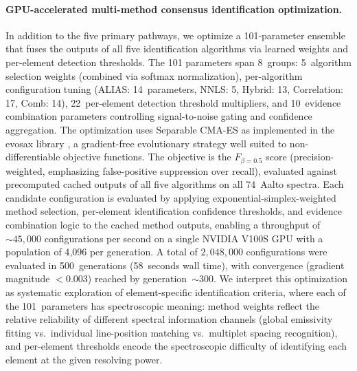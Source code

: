 \paragraph{GPU-accelerated multi-method consensus identification optimization.}
In addition to the five primary pathways, we optimize a 101-parameter ensemble that fuses the outputs of all five identification algorithms via learned weights and per-element detection thresholds.
The 101 parameters span 8~groups: 5~algorithm selection weights (combined via softmax normalization), per-algorithm configuration tuning (ALIAS: 14~parameters, NNLS: 5, Hybrid: 13, Correlation: 17, Comb: 14), 22~per-element detection threshold multipliers, and 10~evidence combination parameters controlling signal-to-noise gating and confidence aggregation.
The optimization uses Separable CMA-ES \citep{Hansen2001,Ros2008} as implemented in the evosax library \citep{Lange2023}, a gradient-free evolutionary strategy well suited to non-differentiable objective functions.
The objective is the $F_{\beta=0.5}$ score \citep{VanRijsbergen1979} (precision-weighted, emphasizing false-positive suppression over recall), evaluated against precomputed cached outputs of all five algorithms on all 74~Aalto spectra.
Each candidate configuration is evaluated by applying exponential-simplex-weighted method selection, per-element identification confidence thresholds, and evidence combination logic to the cached method outputs, enabling a throughput of ${\sim}45{,}000$ configurations per second on a single NVIDIA V100S GPU with a population of 4{,}096 per generation.
A total of $2{,}048{,}000$ configurations were evaluated in 500~generations (58~seconds wall time), with convergence (gradient magnitude $< 0.003$) reached by generation~$\sim$300.
We interpret this optimization as systematic exploration of element-specific identification criteria, where each of the 101~parameters has spectroscopic meaning: method weights reflect the relative reliability of different spectral information channels (global emissivity fitting vs.\ individual line-position matching vs.\ multiplet spacing recognition), and per-element thresholds encode the spectroscopic difficulty of identifying each element at the given resolving power.
